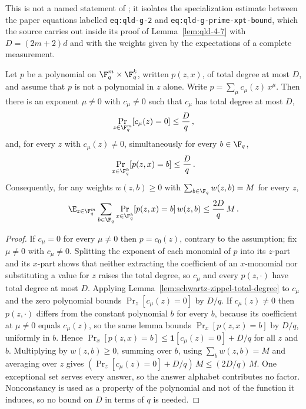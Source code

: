 \begin{lemma}
	\label{lem:qpbt-block-specialization}
	\leanok
	This is not a named statement of \cite{Ji2020MIPStar}; it isolates the
	specialization estimate between the paper equations labelled
	\texttt{eq:qld-g-2} and \texttt{eq:qld-g-prime-xpt-bound}, which the source
	carries out inside its proof of Lemma~\ref{lem:qld-4-7} with
	$D = (2m+2)d$ and with the weights given by the expectations of a complete
	measurement.

	Let $p$ be a polynomial on $\F_q^m \times \F_q^k$, written $p(z,x)$, of
	total degree at most $D$, and assume that $p$ is not a polynomial in $z$
	alone.  Write $p = \sum_\mu c_\mu(z)\,x^\mu$.  Then there is an exponent
	$\mu \neq 0$ with $c_\mu \neq 0$ such that $c_\mu$ has total degree at most
	$D$,
	\[
		\Pr_{z \in \F_q^m}[c_\mu(z) = 0] \le \frac{D}{q}\,,
	\]
	and, for every $z$ with $c_\mu(z) \neq 0$, simultaneously for every
	$b \in \F_q$,
	\[
		\Pr_{x \in \F_q^k}[p(z,x) = b] \le \frac{D}{q}\,.
	\]
	Consequently, for any weights $w(z,b) \ge 0$ with
	$\sum_{b \in \F_q} w(z,b) = M$ for every $z$,
	\[
		\E_{z \in \F_q^m} \sum_{b \in \F_q}
		\Pr_{x \in \F_q^k}[p(z,x) = b] \, w(z,b)
		\le \frac{2D}{q} \, M\,.
	\]
\end{lemma}
\begin{proof}
	\leanok
	If $c_\mu = 0$ for every $\mu \neq 0$ then $p = c_0(z)$, contrary to the
	assumption; fix $\mu \neq 0$ with $c_\mu \neq 0$.  Splitting the exponent
	of each monomial of $p$ into its $z$-part and its $x$-part shows that
	neither extracting the coefficient of an $x$-monomial nor substituting a
	value for $z$ raises the total degree, so $c_\mu$ and every
	$p(z,\cdot)$ have total degree at most $D$.  Applying
	Lemma~\ref{lem:schwartz-zippel-total-degree} to $c_\mu$ and the zero
	polynomial bounds $\Pr_z[c_\mu(z) = 0]$ by $D/q$.  If $c_\mu(z) \neq 0$
	then $p(z,\cdot)$ differs from the constant polynomial $b$ for every
	$b$, because its coefficient at $\mu \neq 0$ equals $c_\mu(z)$, so the
	same lemma bounds $\Pr_x[p(z,x) = b]$ by $D/q$, uniformly in $b$.
	Hence $\Pr_x[p(z,x) = b] \le \mathbf{1}[c_\mu(z) = 0] + D/q$ for all $z$
	and $b$.  Multiplying by $w(z,b) \ge 0$, summing over $b$, using
	$\sum_b w(z,b) = M$ and averaging over $z$ gives
	$(\Pr_z[c_\mu(z) = 0] + D/q)\,M \le (2D/q)\,M$.  One exceptional set
	serves every answer, so the answer alphabet contributes no factor.
	Nonconstancy is used as a property of the polynomial and not of the
	function it induces, so no bound on $D$ in terms of $q$ is needed.
\end{proof}

